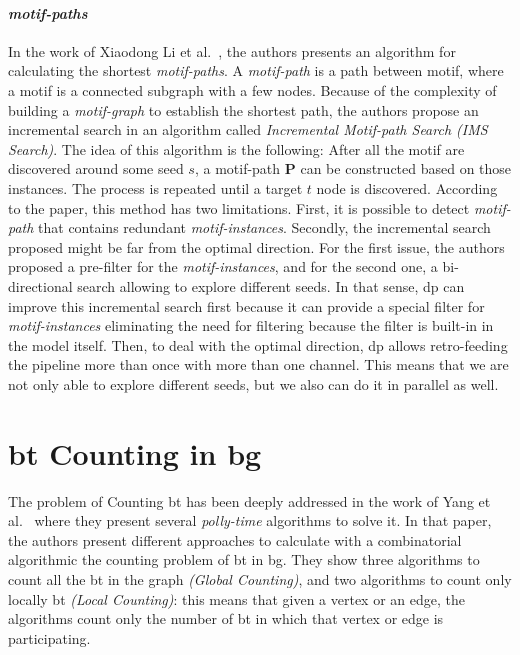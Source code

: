 \paragraph{\emph{motif-paths}} In the work of Xiaodong Li et al.~\cite{Li2019MotifPA}, the authors presents an algorithm for calculating the shortest \emph{motif-paths}.
A \emph{motif-path} is a path between motif, where a motif is a connected subgraph with a few nodes. 
Because of the complexity of building a \emph{motif-graph} to establish the shortest path, the authors propose an incremental search in an algorithm called \emph{Incremental Motif-path Search (IMS Search)}.
The idea of this algorithm is the following: After all the motif are discovered around some seed $s$, a motif-path $\mathbf{P}$ can be constructed based on those instances.
The process is repeated until a target $t$ node is discovered. According to the paper, this method has two limitations. First, it is possible to detect \emph{motif-path} that contains 
redundant \emph{motif-instances}. Secondly, the incremental search proposed might be far from the optimal direction. For the first issue, the authors proposed a pre-filter for the \emph{motif-instances},
and for the second one, a bi-directional search allowing to explore different seeds. 
In that sense, \acrshort{dp} can improve this incremental search first because it can provide a special filter for \emph{motif-instances} eliminating the need for filtering because the filter is built-in in the model itself.
Then, to deal with the optimal direction, \acrshort{dp} allows retro-feeding the pipeline more than once with more than one channel. This means that we are not only able to explore different seeds, but we also can do it in parallel as well.

\section{\acrlong{bt} Counting in \acrlong{bg}}\label{sec:rel-work:counting}
The problem of Counting \acrshort{bt} has been deeply addressed in the work of Yang et al.~\cite{btcount} where they present several \emph{polly-time} algorithms to solve it.
In that paper, the authors present different approaches to calculate with a combinatorial algorithmic the counting problem of \acrshort{bt} in \acrshort{bg}. 
They show three algorithms to count all the \acrshort{bt} in the graph \emph{(Global Counting)}, and two algorithms to count only locally \acrshort{bt} \emph{(Local Counting)}: this means that given a vertex or an edge, the algorithms count only the number of \acrshort{bt} in which 
that vertex or edge is participating.

